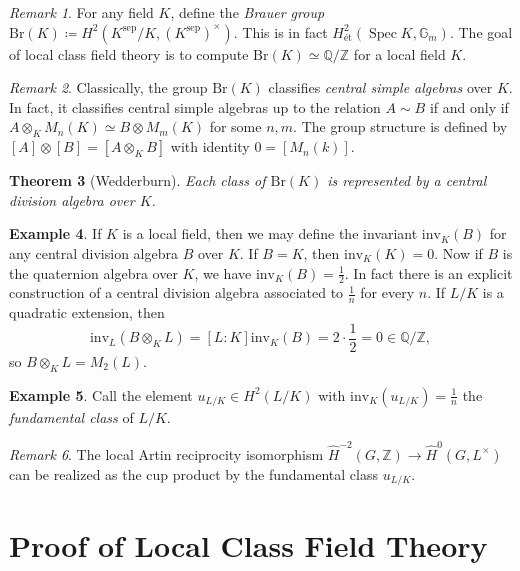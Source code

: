 \documentclass[leqno, openany]{memoir}
\newtheorem{thm}{Theorem}[section]
\theoremstyle{definition}
\newtheorem{exm}[thm]{Example}
\theoremstyle{remark}
\newtheorem{rmk}[thm]{Remark}
\theoremstyle{plain}
\theoremstyle{definition}
\theoremstyle{remark}
\newcommand{\Z}{\mathbb{Z}}
\newcommand{\Q}{\mathbb{Q}}
\newcommand{\mr}[1]{\mathrm{#1}}
\newcommand{\wh}[1]{\widehat{#1}}
\DeclareMathOperator{\Spec}{Spec}
\begin{document}
\begin{rmk} For any field $K$, define the \textit{Brauer group} $\mr{Br}(K)
    \coloneqq H^2(K^{\mr{sep}}/K, {(K^{\mr{sep}})}^{\times})$. This is in fact
    $H^2_{\text{\'et}}(\Spec K, \mathbb{G}_m)$. The goal of local class field
    theory is to compute $\mr{Br}(K) \simeq \Q/\Z$ for a local field $K$.
\end{rmk}

\begin{rmk} Classically, the group $\mr{Br}(K)$ classifies \textit{central
    simple algebras} over $K$. In fact, it classifies central simple algebras
    up to the relation $A \sim B$ if and only if $A \otimes_K M_n(K) \simeq B
    \otimes M_m(K)$ for some $n, m$. The group structure is defined by $[A]
    \otimes [B] = [A \otimes_K B]$ with identity $0 = [M_n(k)]$.  \end{rmk}

\begin{thm}[Wedderburn] Each class of $\mr{Br}(K)$ is represented by a central
division algebra over $K$.  \end{thm}

\begin{exm} If $K$ is a local field, then we may define the invariant
    $\mr{inv}_K(B)$ for any central division algebra $B$ over $K$. If $B = K$,
    then $\mr{inv}_K(K) = 0$. Now if $B$ is the quaternion algebra over $K$, we
    have $\mr{inv}_K(B) = \frac{1}{2}$. In fact there is an explicit
    construction of a central division algebra associated to $\frac{1}{n}$ for
    every $n$. If $L/K$ is a quadratic extension, then \[ \mr{inv}_L(B
    \otimes_K L) = [L:K] \mr{inv}_K(B) = 2 \cdot \frac{1}{2} = 0 \in \Q/\Z, \]
so $B \otimes_K L = M_2(L)$.  \end{exm}

\begin{exm} Call the element $u_{L/K} \in H^2(L/K)$ with $\mr{inv}_K(u_{L/K}) =
\frac{1}{n}$ the \textit{fundamental class} of $L/K$.  \end{exm}

\begin{rmk} The local Artin reciprocity isomorphism $\wh{H}^{-2}(G, \Z) \to
\wh{H}^0(G, L^{\times})$ can be realized as the cup product by the fundamental
class $u_{L/K}$.  \end{rmk}

\section{Proof of Local Class Field Theory}%
\label{sec:proof_of_local_class_field_theory}
\end{document}

